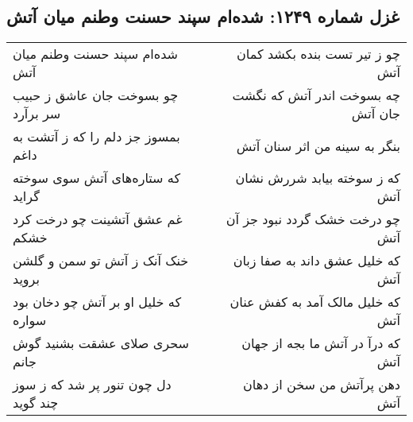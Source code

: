 \begin{center}
\section*{غزل شماره ۱۲۴۹: شده‌ام سپند حسنت وطنم میان آتش}
\label{sec:1249}
\begin{longtable}{l p{0.5cm} r}
شده‌ام سپند حسنت وطنم میان آتش
&&
چو ز تیر تست بنده بکشد کمان آتش
\\
چو بسوخت جان عاشق ز حبیب سر برآرد
&&
چه بسوخت اندر آتش که نگشت جان آتش
\\
بمسوز جز دلم را که ز آتشت به داغم
&&
بنگر به سینه من اثر سنان آتش
\\
که ستاره‌های آتش سوی سوخته گراید
&&
که ز سوخته بیابد شررش نشان آتش
\\
غم عشق آتشینت چو درخت کرد خشکم
&&
چو درخت خشک گردد نبود جز آن آتش
\\
خنک آنک ز آتش تو سمن و گلشن بروید
&&
که خلیل عشق داند به صفا زبان آتش
\\
که خلیل او بر آتش چو دخان بود سواره
&&
که خلیل مالک آمد به کفش عنان آتش
\\
سحری صلای عشقت بشنید گوش جانم
&&
که درآ در آتش ما بجه از جهان آتش
\\
دل چون تنور پر شد که ز سوز چند گوید
&&
دهن پرآتش من سخن از دهان آتش
\\
\end{longtable}
\end{center}
